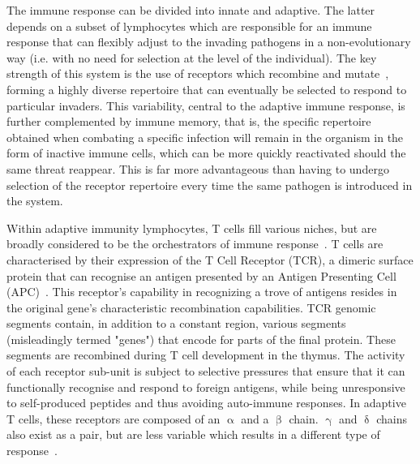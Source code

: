 The immune response can be divided into innate and adaptive. The latter depends on a subset of lymphocytes which are responsible for an immune response that can flexibly adjust to the invading pathogens in a non-evolutionary way (i.e. with no need for selection at the level of the individual). The key strength of this system is the use of receptors which recombine and mutate~\citep{krangel_mechanics_2009}, forming a highly diverse repertoire that can eventually be selected to respond to particular invaders. This variability, central to the adaptive immune response, is further complemented by immune memory, that is, the specific repertoire obtained when combating a specific infection will remain in the organism in the form of inactive immune cells, which can be more quickly reactivated should the same threat reappear. This is far more advantageous than having to undergo selection of the receptor repertoire every time the same pathogen is introduced in the system.

Within adaptive immunity lymphocytes, T cells fill various niches, but are broadly considered to be the orchestrators of immune response~\citep{kumar_human_2018}. T cells are characterised by their expression of the T Cell Receptor (TCR), a dimeric surface protein that can recognise an antigen presented by an Antigen Presenting Cell (APC)~\citep{reinherz_revisiting_2014}. This receptor's capability in recognizing a trove of antigens resides in the original gene's characteristic recombination capabilities. TCR genomic segments contain, in addition to a constant region, various segments (misleadingly termed "genes") that encode for parts of the final protein. These segments are recombined during T cell development in the thymus. The activity of each receptor sub-unit is subject to selective pressures that ensure that it can functionally recognise and respond to foreign antigens, while being unresponsive to self-produced peptides and thus avoiding auto-immune responses. In adaptive T cells, these receptors are composed of an ${\upalpha}$ and a ${\upbeta}$ chain. ${\upgamma}$ and ${\updelta}$ chains also exist as a pair, but are less variable which results in a different type of response~\citep{simoes_molecular_2018}.

